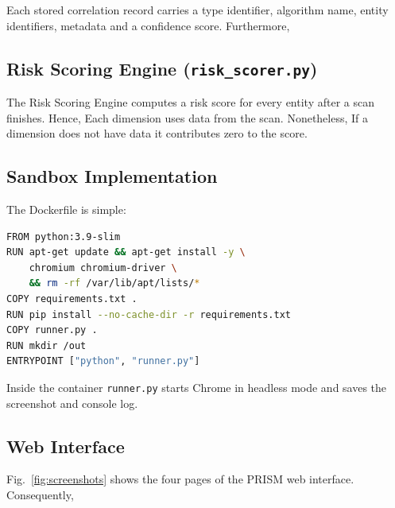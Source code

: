\documentclass[conference]{IEEEtran}
\begin{document}
Each stored correlation record carries a type identifier, algorithm name, entity identifiers, metadata and a confidence score. Furthermore,

\subsection{Risk Scoring Engine (\texttt{risk\_scorer.py})}

The Risk Scoring Engine computes a risk score for every entity after a scan finishes. Hence, Each dimension uses data from the scan. Nonetheless, If a dimension does not have data it contributes zero to the score.

\subsection{Sandbox Implementation}

The Dockerfile is simple:

\begin{lstlisting}[language=bash, caption=Sandbox Dockerfile, label=lst:dockerfile]
FROM python:3.9-slim
RUN apt-get update && apt-get install -y \
    chromium chromium-driver \
    && rm -rf /var/lib/apt/lists/*
COPY requirements.txt .
RUN pip install --no-cache-dir -r requirements.txt
COPY runner.py .
RUN mkdir /out
ENTRYPOINT ["python", "runner.py"]
\end{lstlisting}

Inside the container \texttt{runner.py} starts Chrome in headless mode and saves the screenshot and console log.

\subsection{Web Interface}

Fig.~\ref{fig:screenshots} shows the four pages of the PRISM web interface. Consequently,
\end{document}
